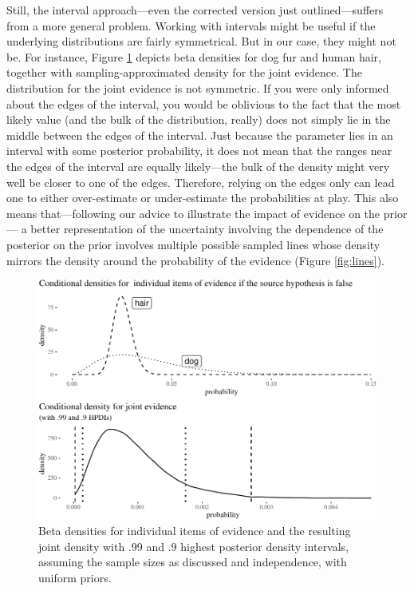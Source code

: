 \documentclass[
  10pt,
  dvipsnames,enabledeprecatedfontcommands]{scrartcl}
\begin{document}
Still, the interval approach---even the corrected version just
outlined---suffers from a more general problem. Working with intervals
might be useful if the underlying distributions are fairly symmetrical.
But in our case, they might not be. For instance, Figure
\ref{fig:densities} depicts beta densities for dog fur and human hair,
together with sampling-approximated density for the joint evidence. The
distribution for the joint evidence is not symmetric. If you were only
informed about the edges of the interval, you would be oblivious to the
fact that the most likely value (and the bulk of the distribution,
really) does not simply lie in the middle between the edges of the
interval. Just because the parameter lies in an interval with some
posterior probability, it does not mean that the ranges near the edges
of the interval are equally likely---the bulk of the density might very
well be closer to one of the edges. Therefore, relying on the edges only
can lead one to either over-estimate or under-estimate the probabilities
at play. This also means that---following our advice to illustrate the
impact of evidence on the prior--- a better representation of the
uncertainty involving the dependence of the posterior on the prior
involves multiple possible sampled lines whose density mirrors the
density around the probability of the evidence (Figure \ref{fig:lines}).

\begin{figure}[H]

\begin{center}\includegraphics[width=0.8\linewidth]{chapter-outline_files/figure-latex/fig:densities-1} \end{center}
\caption{Beta densities for individual items of evidence and the resulting joint density with .99 and .9 highest posterior density intervals, assuming the sample sizes as discussed and independence, with uniform priors.}
\label{fig:densities}
\end{figure}
\end{document}
